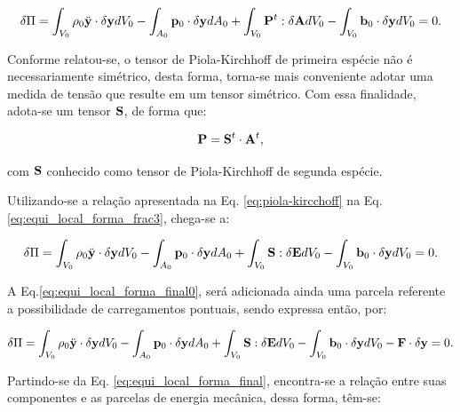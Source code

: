 \documentclass[tese_patricia]{subfiles}
\begin{document}
\begin{align}
\delta\Pi = \int_{V_{0}} \rho_{0} \ddot{\mathbf{y}} \cdot \delta\mathbf{y} dV_{0} - \int_{A_{0}} \mathbf{p}_{0} \cdot \delta\mathbf{y} dA_{0} + \int_{V_{0}} \mathbf{P}^{t} : \delta\mathbf{A} dV_{0} - \int_{V_{0}}  \mathbf{b}_0 \cdot \delta\mathbf{y} dV_{0} = 0. \label{eq:equi_local_forma_frac3}
\end{align}

Conforme relatou-se, o tensor de Piola-Kirchhoff de primeira espécie não é necessariamente simétrico, desta forma, torna-se mais conveniente adotar uma medida de tensão que resulte em um tensor simétrico. Com essa finalidade, adota-se um tensor $\mathbf{S}$, de forma que:

\begin{align}
\mathbf{P} = \mathbf{S}^{t} \cdot \mathbf{A}^{t}, \label{eq:piola-kircchoff}
\end{align}

\noindent com $\mathbf{S}$ conhecido como tensor de Piola-Kirchhoff de segunda espécie. 

Utilizando-se a relação apresentada na Eq. \ref{eq:piola-kircchoff} na Eq. \ref{eq:equi_local_forma_frac3}, chega-se a:

\begin{align}
\delta\Pi = \int_{V_{0}} \rho_{0} \ddot{\mathbf{y}} \cdot \delta\mathbf{y} dV_{0} - \int_{A_{0}} \mathbf{p}_{0} \cdot \delta\mathbf{y} dA_{0} +  \int_{V_{0}} \mathbf{S} : \delta\mathbf{E} dV_{0} - \int_{V_{0}}  \mathbf{b}_0 \cdot \delta\mathbf{y} dV_{0} = 0.
\label{eq:equi_local_forma_final0}
\end{align}

A Eq.\ref{eq:equi_local_forma_final0}, será adicionada ainda uma parcela referente a possibilidade de carregamentos pontuais, sendo expressa então, por:

\begin{align}
	\delta\Pi = \int_{V_{0}} \rho_{0} \ddot{\mathbf{y}} \cdot \delta\mathbf{y} dV_{0} - \int_{A_{0}} \mathbf{p}_{0} \cdot \delta\mathbf{y} dA_{0} +  \int_{V_{0}} \mathbf{S} : \delta\mathbf{E} dV_{0} - \int_{V_{0}}  \mathbf{b}_0 \cdot \delta\mathbf{y} dV_{0} - \mathbf{F} \cdot \delta\mathbf{y} = 0.
	\label{eq:equi_local_forma_final}
\end{align}

Partindo-se da Eq. \ref{eq:equi_local_forma_final}, encontra-se a relação entre suas componentes e as parcelas de energia mecânica, dessa forma, têm-se:
\end{document}
